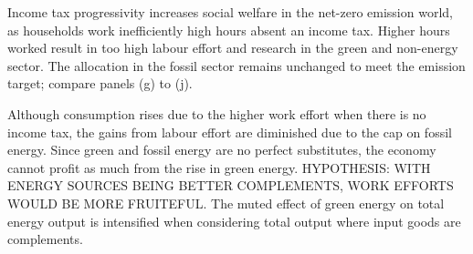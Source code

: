 Income tax progressivity increases social welfare in the net-zero emission world, as households work inefficiently high hours absent an income tax. Higher hours worked result in too high labour effort and research in the green and non-energy sector. The allocation in the fossil sector remains unchanged to meet the emission target; compare panels (g) to (j). 

Although consumption rises due to the higher work effort when there is no income tax, the gains from labour effort are diminished due to the cap on fossil energy. Since green and fossil energy are no perfect substitutes, the economy cannot profit as much from the rise in green energy. HYPOTHESIS: WITH ENERGY SOURCES BEING BETTER COMPLEMENTS, WORK EFFORTS WOULD BE MORE FRUITEFUL. The muted effect of green energy on total energy output is intensified when considering total output where input goods are complements. 

